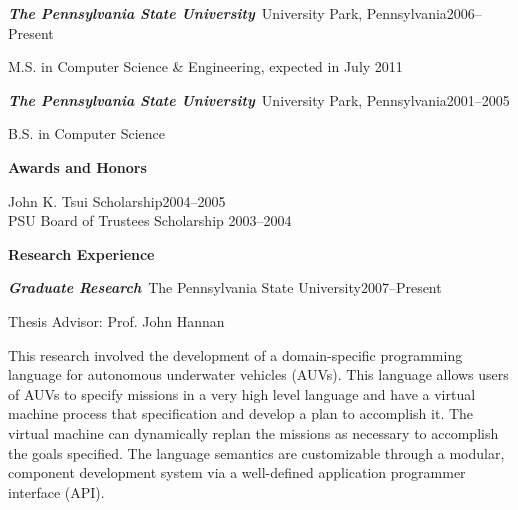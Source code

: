 \documentclass[11pt]{psuthesis}
\begin{document}
\begin{singlespace}
\par\noindent
\textbf{\textit{The Pennsylvania State University}}\, University Park, Pennsylvania\hfill 2006--Present

\smallskip

\par\noindent
\hspace{0.10truein}  
\parbox{6.15truein}{
\par\noindent
M.S. in Computer Science \& Engineering, expected in July 2011}

\medskip

\par\noindent
\textbf{\textit{The Pennsylvania State University}}\, University Park, Pennsylvania\hfill 2001--2005

\smallskip

\par\noindent
\hspace{0.10truein}  
\parbox{6.15truein}{
\par\noindent
B.S. in Computer Science
}

\medskip

\large
\centerline{{\bf Awards and Honors}}
\normalsize

\smallskip

\par\noindent
John K. Tsui Scholarship\hfill2004--2005\\ 
PSU Board of Trustees Scholarship \hfill2003--2004\\

\medskip

\large
\centerline{{\bf Research Experience}}
\normalsize

\smallskip

\par\noindent
\textbf{\textit{Graduate Research}}\, The Pennsylvania State University\hfill2007--Present
\par\noindent
Thesis Advisor: Prof. John Hannan

\smallskip

\par\noindent
\hspace{0.10truein}  
\parbox{5.7truein}{
\par\noindent
This research involved the development of a domain-specific programming language for autonomous underwater vehicles (AUVs). This language allows users of AUVs to specify missions in a very high level language and have a virtual machine process that specification and develop a plan to accomplish it. The virtual machine can dynamically replan the missions as necessary to accomplish the goals specified. The language semantics are customizable through a modular, component development system via a well-defined application programmer interface (API).
}


\end{singlespace}
\end{document}
